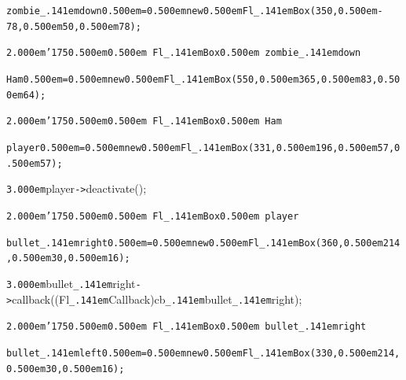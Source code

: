 \documentclass[12pt]{article}
\begin{document}
\noindent
\tt{}zombie{\tt\_\kern.141em}down{\tt\mc \kern0.500em}={\tt\mc \kern0.500em}new{\tt\mc \kern0.500em}Fl{\tt\_\kern.141em}Box(350,{\tt\mc \kern0.500em}{\tt -}78,{\tt\mc \kern0.500em}50,{\tt\mc \kern0.500em}78);

\noindent
{}{\tt\mc \kern2.000em}{\tt\char'175}{\tt\mc \kern0.500em}\tt\mc {\tt /}{\tt /}\kern0.500em Fl{\tt\_\kern.141em}Box{\tt *}\kern0.500em zombie{\tt\_\kern.141em}down

\noindent
\tt{}Ham{\tt\mc \kern0.500em}={\tt\mc \kern0.500em}new{\tt\mc \kern0.500em}Fl{\tt\_\kern.141em}Box(550,{\tt\mc \kern0.500em}365,{\tt\mc \kern0.500em}83,{\tt\mc \kern0.500em}64);

\noindent
{}{\tt\mc \kern2.000em}{\tt\char'175}{\tt\mc \kern0.500em}\tt\mc {\tt /}{\tt /}\kern0.500em Fl{\tt\_\kern.141em}Box{\tt *}\kern0.500em Ham

\noindent
\tt{}player{\tt\mc \kern0.500em}={\tt\mc \kern0.500em}new{\tt\mc \kern0.500em}Fl{\tt\_\kern.141em}Box(331,{\tt\mc \kern0.500em}196,{\tt\mc \kern0.500em}57,{\tt\mc \kern0.500em}57);

\noindent
{}{\tt\mc \kern3.000em}player{\tt -}{\tt >}deactivate();

\noindent
{}{\tt\mc \kern2.000em}{\tt\char'175}{\tt\mc \kern0.500em}\tt\mc {\tt /}{\tt /}\kern0.500em Fl{\tt\_\kern.141em}Box{\tt *}\kern0.500em player

\noindent
\tt{}bullet{\tt\_\kern.141em}right{\tt\mc \kern0.500em}={\tt\mc \kern0.500em}new{\tt\mc \kern0.500em}Fl{\tt\_\kern.141em}Box(360,{\tt\mc \kern0.500em}214,{\tt\mc \kern0.500em}30,{\tt\mc \kern0.500em}16);

\noindent
{}{\tt\mc \kern3.000em}bullet{\tt\_\kern.141em}right{\tt -}{\tt >}callback((Fl{\tt\_\kern.141em}Callback{\tt *})cb{\tt\_\kern.141em}bullet{\tt\_\kern.141em}right);

\noindent
{}{\tt\mc \kern2.000em}{\tt\char'175}{\tt\mc \kern0.500em}\tt\mc {\tt /}{\tt /}\kern0.500em Fl{\tt\_\kern.141em}Box{\tt *}\kern0.500em bullet{\tt\_\kern.141em}right

\noindent
\tt{}bullet{\tt\_\kern.141em}left{\tt\mc \kern0.500em}={\tt\mc \kern0.500em}new{\tt\mc \kern0.500em}Fl{\tt\_\kern.141em}Box(330,{\tt\mc \kern0.500em}214,{\tt\mc \kern0.500em}30,{\tt\mc \kern0.500em}16);
\end{document}
